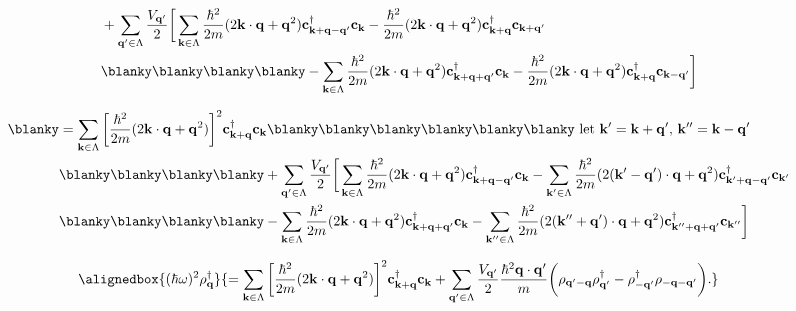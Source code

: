 \begin{equation}
\begin{split}
    & + \sum_{{\bf q}' \in \Lambda} \frac{V_{\bf q'}}{2} \bigg[ \sum_{{\bf k} \in \Lambda}\frac{\hbar^2}{2m}(2 {\bf k}\cdot {\bf q} + {\bf q}^2) {\bf c}_{{\bf {\bf k} + q - q'}}^\dagger {\bf c}_{{\bf k}} - \frac{\hbar^2}{2m}(2 {\bf k}\cdot {\bf q} + {\bf q}^2) {\bf c}_{{\bf k + q}}^\dagger {\bf c}_{{\bf {\bf k} + q'}} \\
    & \blanky \blanky \blanky \blanky - \sum_{{\bf k} \in \Lambda}\frac{\hbar^2}{2m}(2 {\bf k}\cdot {\bf q} + {\bf q}^2) {\bf c}_{{\bf {\bf k} + q + q'}}^\dagger {\bf c}_{{\bf k}} - \frac{\hbar^2}{2m}(2 {\bf k}\cdot {\bf q} + {\bf q}^2) {\bf c}_{{\bf k + q}}^\dagger {\bf c}_{{\bf {\bf k} - q'}}\bigg] \\
    \end{split}
\end{equation}

\begin{equation}
    \begin{split}
 \blanky  
&= \sum_{{\bf k} \in \Lambda} \bigg[ \frac{\hbar^2}{2m} (2 {\bf k} \cdot {\bf q} + {\bf q}^2)\bigg]^2 {\bf c}_{{\bf k}+{\bf q}}^\dagger {\bf c}_{{\bf k}} \blanky \blanky \blanky \blanky \blanky \blanky \textnormal{  let ${\bf k}' = {\bf k} + {\bf q}'$, ${\bf k}'' = {\bf k} - {\bf q}'$}\\
 & \blanky \blanky \blanky \blanky + \sum_{{\bf q}' \in \Lambda} \frac{V_{\bf q'}}{2} \bigg[ \sum_{{\bf k} \in \Lambda}\frac{\hbar^2}{2m}(2 {\bf k}\cdot {\bf q} + {\bf q}^2) {\bf c}_{{\bf {\bf k} + q - q'}}^\dagger {\bf c}_{{\bf k}} - \sum_{{\bf k}' \in \Lambda}\frac{\hbar^2}{2m}(2 ({\bf k}' - {\bf q}')\cdot {\bf q} + {\bf q}^2) {\bf c}_{{\bf k' + q - q'}}^\dagger {\bf c}_{{\bf {\bf k}'}}\\ 
 & \blanky \blanky \blanky \blanky - \sum_{{\bf k} \in \Lambda}\frac{\hbar^2}{2m}(2 {\bf k}\cdot {\bf q} + {\bf q}^2) {\bf c}_{{\bf {\bf k} + q + q'}}^\dagger {\bf c}_{{\bf k}} - \sum_{{\bf k}'' \in \Lambda}\frac{\hbar^2}{2m}(2 ({\bf k}'' + {\bf q}')\cdot {\bf q} + {\bf q}^2) {\bf c}_{{\bf k'' + q + q'}}^\dagger {\bf c}_{{\bf {\bf k}''}} \bigg] \\
    \end{split}
\end{equation}

\begin{align}
     \alignedbox{(\hbar \omega)^2 \rho_{{\bf q}}^\dagger}{= \sum_{{\bf k} \in \Lambda} \bigg[ \frac{\hbar^2}{2m} (2 {\bf k} \cdot {\bf q} + {\bf q}^2)\bigg]^2 {\bf c}_{{\bf k}+{\bf q}}^\dagger {\bf c}_{{\bf k}} + \sum_{{\bf q}' \in \Lambda} \frac{V_{\bf q'}}{2} \frac{\hbar^2 {\bf q} \cdot {\bf q}'}{m} \bigg(\rho_{{\bf q}' - {\bf q}} \rho_{{\bf q}'}^\dagger - \rho_{{-{\bf q}'}}^\dagger \rho_{-{\bf q} - {\bf q}'} \bigg).}
     \label{RPA-basis equation}
\end{align}

